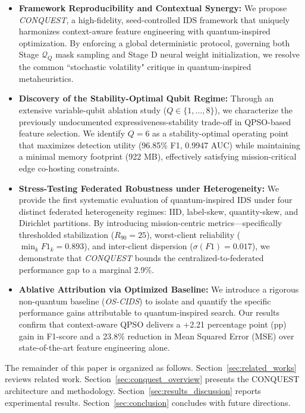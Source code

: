 \documentclass[conference]{IEEEtran}
\begin{document}
\begin{itemize}
    \item \textbf{Framework Reproducibility and Contextual Synergy:} We propose \textit{CONQUEST}, a high-fidelity, seed-controlled IDS framework that uniquely harmonizes context-aware feature engineering with quantum-inspired optimization. By enforcing a global deterministic protocol, governing both Stage $\mathcal{Q}_{Q}$ mask sampling and Stage D neural weight initialization, we resolve the common ``stochastic volatility" critique in quantum-inspired metaheuristics.

    \item \textbf{Discovery of the Stability-Optimal Qubit Regime:} Through an extensive variable-qubit ablation study ($Q \in \{1, \dots, 8\}$), we characterize the previously undocumented expressiveness-stability trade-off in QPSO-based feature selection. We identify $Q=6$ as a stability-optimal operating point that maximizes detection utility (96.85\% F1, 0.9947 AUC) while maintaining a minimal memory footprint (922 MB), effectively satisfying mission-critical edge co-hosting constraints.

    \item \textbf{Stress-Testing Federated Robustness under Heterogeneity:} We provide the first systematic evaluation of quantum-inspired IDS under four distinct federated heterogeneity regimes: IID, label-skew, quantity-skew, and Dirichlet partitions. By introducing mission-centric metrics—specifically thresholded stabilization ($R_{90}=25$), worst-client reliability ($\min_{k} F1_{k}=0.893$), and inter-client dispersion ($\sigma(F1)=0.017$), we demonstrate that \textit{CONQUEST} bounds the centralized-to-federated performance gap to a marginal 2.9\%.

    \item \textbf{Ablative Attribution via Optimized Baseline:} We introduce a rigorous non-quantum baseline (\textit{OS-CIDS}) to isolate and quantify the specific performance gains attributable to quantum-inspired search. Our results confirm that context-aware QPSO delivers a +2.21 percentage point (pp) gain in F1-score and a 23.8\% reduction in Mean Squared Error (MSE) over state-of-the-art feature engineering alone.
\end{itemize}

The remainder of this paper is organized as follows.
Section~\ref{sec:related_works} reviews related work.
Section~\ref{sec:conquest_overview} presents the CONQUEST architecture and methodology. Section~\ref{sec:results_discussion} reports
experimental results. Section~\ref{sec:conclusion} concludes with future directions.
\end{document}
